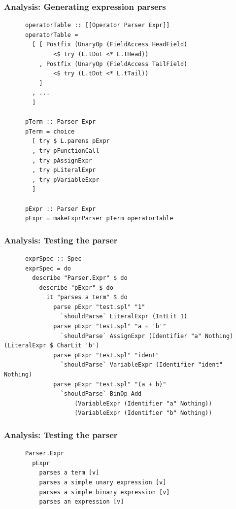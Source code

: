 \documentclass{beamer}
\begin{document}
\begin{frame}[fragile]
  \frametitle{Analysis: Generating expression parsers}

  \begin{center}
    \begin{verbatim}
      operatorTable :: [[Operator Parser Expr]]
      operatorTable =
        [ [ Postfix (UnaryOp (FieldAccess HeadField) 
              <$ try (L.tDot <* L.tHead))
          , Postfix (UnaryOp (FieldAccess TailField) 
              <$ try (L.tDot <* L.tTail))
          ]
        , ...
        ]

      pTerm :: Parser Expr
      pTerm = choice
        [ try $ L.parens pExpr
        , try pFunctionCall
        , try pAssignExpr
        , try pLiteralExpr
        , try pVariableExpr
        ]

      pExpr :: Parser Expr
      pExpr = makeExprParser pTerm operatorTable
    \end{verbatim}
  \end{center}
\end{frame}

\begin{frame}[fragile]
  \frametitle{Analysis: Testing the parser}

  \begin{center}
    \begin{verbatim}
      exprSpec :: Spec
      exprSpec = do
        describe "Parser.Expr" $ do
          describe "pExpr" $ do
            it "parses a term" $ do
              parse pExpr "test.spl" "1" 
                `shouldParse` LiteralExpr (IntLit 1)
              parse pExpr "test.spl" "a = 'b'" 
                `shouldParse` AssignExpr (Identifier "a" Nothing) (LiteralExpr $ CharLit 'b')
              parse pExpr "test.spl" "ident"
                `shouldParse` VariableExpr (Identifier "ident" Nothing)
              parse pExpr "test.spl" "(a + b)"
                `shouldParse` BinOp Add 
                    (VariableExpr (Identifier "a" Nothing))
                    (VariableExpr (Identifier "b" Nothing))
    \end{verbatim}
  \end{center}
\end{frame}

\begin{frame}[fragile]
  \frametitle{Analysis: Testing the parser}

  \begin{center}
    \begin{verbatim}
      Parser.Expr
        pExpr
          parses a term [v]
          parses a simple unary expression [v]
          parses a simple binary expression [v]
          parses an expression [v]
    \end{verbatim}
  \end{center}
\end{frame}
\end{document}
